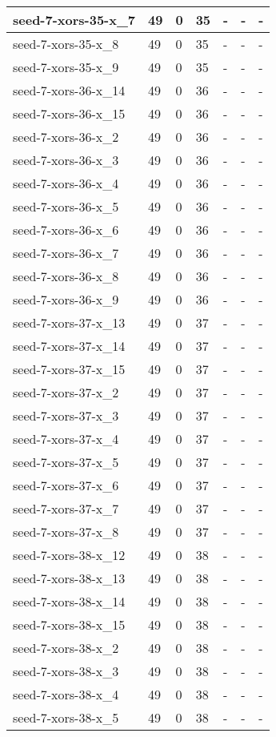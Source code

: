 \begin{scriptsize}
\begin{longtable}{|p{5cm}|l|l|l|l|l|l|}
seed-7-xors-35-x\_7&49&0&35&-&-&- \\ \hline 
seed-7-xors-35-x\_8&49&0&35&-&-&- \\ \hline 
seed-7-xors-35-x\_9&49&0&35&-&-&- \\ \hline 
seed-7-xors-36-x\_14&49&0&36&-&-&- \\ \hline 
seed-7-xors-36-x\_15&49&0&36&-&-&- \\ \hline 
seed-7-xors-36-x\_2&49&0&36&-&-&- \\ \hline 
seed-7-xors-36-x\_3&49&0&36&-&-&- \\ \hline 
seed-7-xors-36-x\_4&49&0&36&-&-&- \\ \hline 
seed-7-xors-36-x\_5&49&0&36&-&-&- \\ \hline 
seed-7-xors-36-x\_6&49&0&36&-&-&- \\ \hline 
seed-7-xors-36-x\_7&49&0&36&-&-&- \\ \hline 
seed-7-xors-36-x\_8&49&0&36&-&-&- \\ \hline 
seed-7-xors-36-x\_9&49&0&36&-&-&- \\ \hline 
seed-7-xors-37-x\_13&49&0&37&-&-&- \\ \hline 
seed-7-xors-37-x\_14&49&0&37&-&-&- \\ \hline 
seed-7-xors-37-x\_15&49&0&37&-&-&- \\ \hline 
seed-7-xors-37-x\_2&49&0&37&-&-&- \\ \hline 
seed-7-xors-37-x\_3&49&0&37&-&-&- \\ \hline 
seed-7-xors-37-x\_4&49&0&37&-&-&- \\ \hline 
seed-7-xors-37-x\_5&49&0&37&-&-&- \\ \hline 
seed-7-xors-37-x\_6&49&0&37&-&-&- \\ \hline 
seed-7-xors-37-x\_7&49&0&37&-&-&- \\ \hline 
seed-7-xors-37-x\_8&49&0&37&-&-&- \\ \hline 
seed-7-xors-38-x\_12&49&0&38&-&-&- \\ \hline 
seed-7-xors-38-x\_13&49&0&38&-&-&- \\ \hline 
seed-7-xors-38-x\_14&49&0&38&-&-&- \\ \hline 
seed-7-xors-38-x\_15&49&0&38&-&-&- \\ \hline 
seed-7-xors-38-x\_2&49&0&38&-&-&- \\ \hline 
seed-7-xors-38-x\_3&49&0&38&-&-&- \\ \hline 
seed-7-xors-38-x\_4&49&0&38&-&-&- \\ \hline 
seed-7-xors-38-x\_5&49&0&38&-&-&- \\ \hline 

\end{longtable}
\end{scriptsize}
